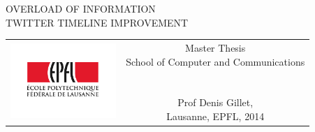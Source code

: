 \begin{titlepage}
\begin{center}
\sffamily


\null\vspace{2cm}
{\huge OVERLOAD OF INFORMATION \\[12pt] TWITTER TIMELINE IMPROVEMENT} \\[24pt] 
    
\vfill

\begin{tabular} {cc}
\parbox{0.3\textwidth}{\includegraphics[width=4cm]{images/epfl}}
&
\parbox{0.7\textwidth}{%
	Master Thesis\\
	School of Computer and Communications\\
	\\
	\\
	
\small
    Prof Denis Gillet, \\

%
Lausanne, EPFL, 2014}
\end{tabular}
\end{center}
\vspace{2cm}
\end{titlepage}



